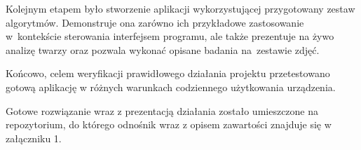 \par

Kolejnym etapem było stworzenie aplikacji wykorzystującej przygotowany zestaw algorytmów. Demonstruje ona zarówno ich przykładowe zastosowanie w~kontekście sterowania interfejsem programu, ale także prezentuje na żywo analizę twarzy oraz pozwala wykonać opisane badania na~zestawie zdjęć.

\par

Końcowo, celem weryfikacji prawidłowego działania projektu przetestowano gotową aplikację w różnych warunkach codziennego użytkowania urządzenia.

\par

Gotowe rozwiązanie wraz z prezentacją działania zostało umieszczone na repozytorium, do którego odnośnik wraz z opisem zawartości znajduje się w załączniku 1. 